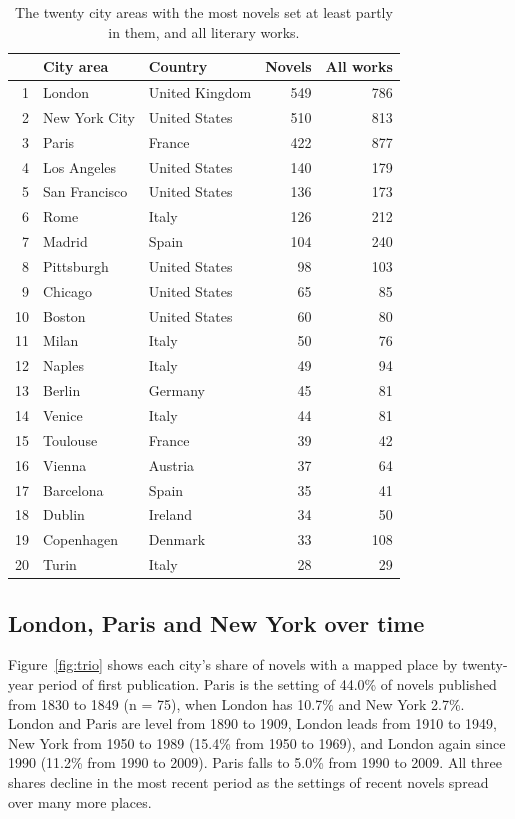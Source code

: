 \documentclass[11pt,a4paper]{article}
\begin{document}
\begin{table}[tbp]\centering\small\caption{The twenty city areas with the most novels set at least partly in them, and all literary works.}\label{tab:cities}\begin{tabular}{rllrr}\toprule & City area & Country & Novels & All works\\\midrule
1 & London & United Kingdom & 549 & 786\\
2 & New York City & United States & 510 & 813\\
3 & Paris & France & 422 & 877\\
4 & Los Angeles & United States & 140 & 179\\
5 & San Francisco & United States & 136 & 173\\
6 & Rome & Italy & 126 & 212\\
7 & Madrid & Spain & 104 & 240\\
8 & Pittsburgh & United States & 98 & 103\\
9 & Chicago & United States & 65 & 85\\
10 & Boston & United States & 60 & 80\\
11 & Milan & Italy & 50 & 76\\
12 & Naples & Italy & 49 & 94\\
13 & Berlin & Germany & 45 & 81\\
14 & Venice & Italy & 44 & 81\\
15 & Toulouse & France & 39 & 42\\
16 & Vienna & Austria & 37 & 64\\
17 & Barcelona & Spain & 35 & 41\\
18 & Dublin & Ireland & 34 & 50\\
19 & Copenhagen & Denmark & 33 & 108\\
20 & Turin & Italy & 28 & 29\\
\bottomrule\end{tabular}\end{table}

\subsection{London, Paris and New York over time}
Figure~\ref{fig:trio} shows each city's share of novels with a mapped place by twenty-year period of first publication. Paris is the setting of 44.0\% of novels published from 1830 to 1849 (n = 75), when London has 10.7\% and New York 2.7\%. London and Paris are level from 1890 to 1909, London leads from 1910 to 1949, New York from 1950 to 1989 (15.4\% from 1950 to 1969), and London again since 1990 (11.2\% from 1990 to 2009). Paris falls to 5.0\% from 1990 to 2009. All three shares decline in the most recent period as the settings of recent novels spread over many more places.
\end{document}
